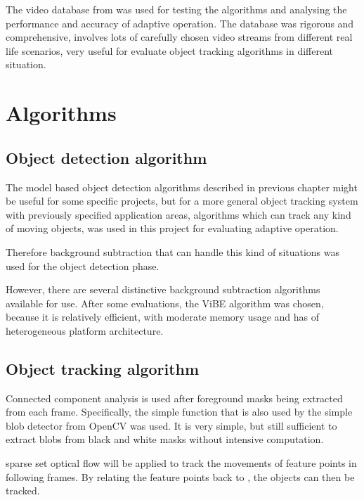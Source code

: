 The video database from \cite{goyette2012changedetection} was used for testing the algorithms and analysing the performance and accuracy of adaptive operation. The database was rigorous and comprehensive, involves lots of carefully chosen video streams from different real life scenarios, very useful for evaluate object tracking algorithms in different situation.

\section{Algorithms}

\subsection{Object detection algorithm}

The model based object detection algorithms described in previous chapter might be useful for some specific projects, but for a more general object tracking system with previously specified application areas,  algorithms which can track any kind of moving objects, was used in this project for evaluating adaptive operation.

 Therefore background subtraction that can handle this kind of situations was used for the object detection phase.

However, there are several distinctive background subtraction algorithms available for use. After some evaluations, the ViBE algorithm was chosen, because it is relatively efficient, with moderate memory usage and has  of heterogeneous platform architecture.

\subsection{Object tracking algorithm}

Connected component analysis is used after foreground masks being extracted from each frame. Specifically, the simple  function that is also used by the simple blob detector from OpenCV was used. It is very simple, but still sufficient to extract blobs from black and white masks without intensive computation.


 sparse set optical flow will be applied to track the movements of feature points in following frames. By relating the feature points back to , the objects can then be tracked.

